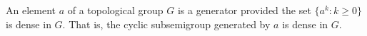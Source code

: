 An element $a$ of a topological group $G$ is a generator provided the set $\{a^k : k \geq 0\}$ is dense in $G$. That is, the cyclic subsemigroup generated by $a$ is dense in $G$.
